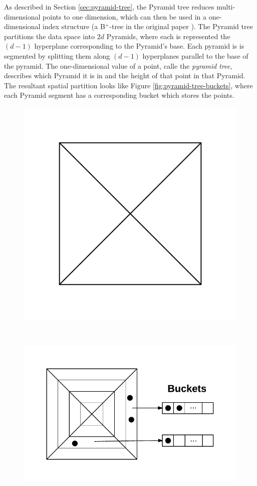As described in Section \ref{sec:pyramid-tree}, the Pyramid tree reduces multi-dimensional points to one dimension, which can then be used in a one-dimensional index structure (a B${}^{+}$-tree in the original paper \cite{pyramid-tree}). The Pyramid tree partitions the data space into $2d$ Pyramids, where each is represented the $(d - 1)$ hyperplane  corresponding to the Pyramid's base. Each pyramid is is segmented by splitting them along $(d-1)$ hyperplanes parallel to the base of the pyramid. The one-dimensional value of a point, calle the \textit{pyramid tree}, describes which Pyramid it is in and the height of that point in that Pyramid. The resultant spatial partition looks like Figure \ref{fig:pyramid-tree-buckets}, where each Pyramid segment has a corresponding bucket which stores the points.

\begin{figure}
		\begin{center}
			\begin{subfloat}{%
				\includegraphics[scale=0.5]{figures/pyramid_tree_partition.pdf}
			}
			\end{subfloat}~
			\begin{subfloat} {%
				\includegraphics[scale=0.5]{figures/pyramid_tree_buckets.pdf}
			}

\end{subfloat}
\end{center}
\end{figure}
